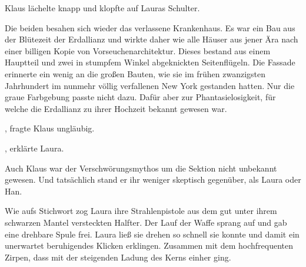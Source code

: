 \par

Klaus lächelte knapp und klopfte auf Lauras Schulter. 

\par

Die beiden besahen sich wieder das verlassene Krankenhaus. Es war ein Bau aus der Blütezeit der Erdallianz und wirkte daher wie alle Häuser aus jener Ära nach einer billigen Kopie von Vorseuchenarchitektur. Dieses bestand aus einem Hauptteil und zwei in stumpfem Winkel abgeknickten Seitenflügeln. Die Fassade erinnerte ein wenig an die großen Bauten, wie sie im frühen zwanzigsten Jahrhundert im nunmehr völlig verfallenen New York gestanden hatten. Nur die graue Farbgebung passte nicht dazu. Dafür aber zur Phantasielosigkeit, für welche die Erdallianz zu ihrer Hochzeit bekannt gewesen war.

\par

, fragte Klaus ungläubig.

\par

, erklärte Laura. 

\par

Auch Klaus war der Verschwörungsmythos um die Sektion nicht unbekannt gewesen. Und tatsächlich stand er ihr weniger skeptisch gegenüber, als Laura oder Han. 

\par

Wie aufs Stichwort zog Laura ihre Strahlenpistole aus dem gut unter ihrem schwarzen Mantel versteckten Halfter.  Der Lauf der Waffe sprang auf und gab eine drehbare Spule frei. Laura ließ sie drehen so schnell sie konnte und damit ein unerwartet beruhigendes Klicken erklingen. Zusammen mit dem hochfrequenten Zirpen, dass mit der steigenden Ladung des Kerns einher ging.

